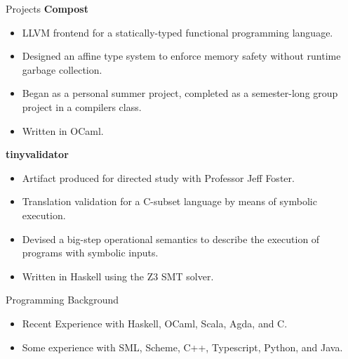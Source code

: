 \documentclass{resume} %
\begin{document}
\begin{rSection}{Projects}
{\bf Compost}
\begin{itemize}
    \item LLVM frontend for a statically-typed functional programming language.
    \item Designed an affine type system to enforce memory safety without runtime garbage collection.
    \item Began as a personal summer project, completed as a semester-long group project in a compilers class.
    \item Written in OCaml.
\end{itemize}
{\bf tinyvalidator} 
\begin{itemize}
    \item Artifact produced for directed study with Professor Jeff Foster.
    \item Translation validation for a C-subset language by means of symbolic execution.
    \item Devised a big-step operational semantics to describe the execution of programs with symbolic inputs.
    \item Written in Haskell using the Z3 SMT solver.
\end{itemize}
\end{rSection}
\begin{rSection}{Programming Background}
\begin{itemize}
    \item Recent Experience with Haskell, OCaml, Scala, Agda, and C.
    \item Some experience with SML, Scheme, C++, Typescript, Python, and Java.
\end{itemize}
\end{rSection}


\end{document}
